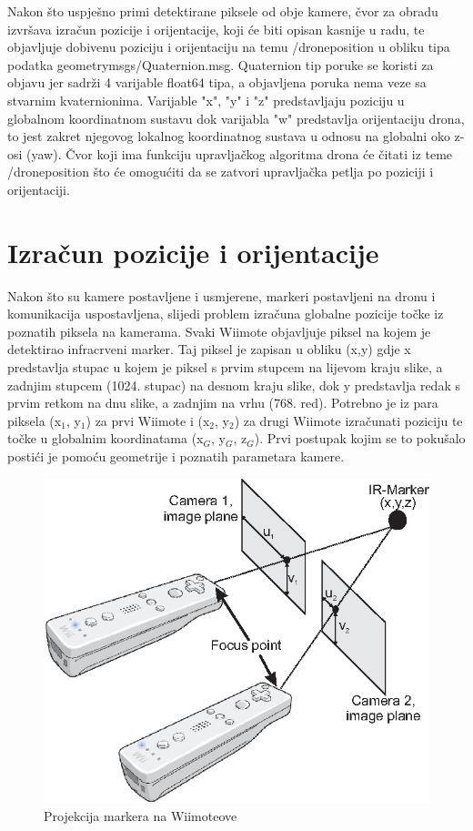 \documentclass[times, utf8, diplomski]{fer}
\begin{document}
Nakon što uspješno primi detektirane piksele od obje kamere, čvor za obradu izvršava izračun pozicije i orijentacije, koji će biti opisan kasnije u radu, te objavljuje dobivenu poziciju i orijentaciju na temu /drone\textunderscore position u obliku tipa podatka geometry\textunderscore msgs/Quaternion.msg. Quaternion tip poruke se koristi za objavu jer sadrži 4 varijable float64 tipa, a objavljena poruka nema veze sa stvarnim kvaternionima. Varijable "x", "y" i "z" predstavljaju poziciju u globalnom koordinatnom sustavu dok varijabla "w" predstavlja orijentaciju drona, to jest zakret njegovog lokalnog koordinatnog sustava u odnosu na globalni oko z-osi (yaw). Čvor koji ima funkciju upravljačkog algoritma drona će čitati iz teme /drone\textunderscore position što će omogućiti da se zatvori upravljačka petlja po poziciji i orijentaciji.

\chapter{Izračun pozicije i orijentacije}
Nakon što su kamere postavljene i usmjerene, markeri postavljeni na dronu i komunikacija uspostavljena, slijedi problem izračuna globalne pozicije točke iz poznatih piksela na kamerama. Svaki Wiimote objavljuje piksel na kojem je detektirao infracrveni marker. Taj piksel je zapisan u obliku (x,y) gdje x predstavlja stupac u kojem je piksel s prvim stupcem na lijevom kraju slike, a zadnjim stupcem (1024. stupac) na desnom kraju slike, dok y predstavlja redak s prvim retkom na dnu slike, a zadnjim na vrhu (768. red). Potrebno je iz para piksela (x$_1$, y$_1$) za prvi Wiimote i (x$_2$, y$_2$) za drugi Wiimote izračunati poziciju te točke u globalnim koordinatama (x$_G$, y$_G$, z$_G$). Prvi postupak kojim se to pokušalo postići je pomoću geometrije i poznatih parametara kamere.

\begin{figure}[h]
\centering
\includegraphics[width=.6\textwidth]{wiimote2_rays}
\caption{Projekcija markera na Wiimoteove}
\label{fig:zrake}
\end{figure}
\end{document}
